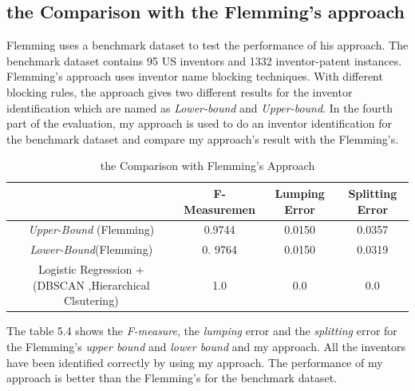 \subsection{the Comparison with the Flemming's approach}
Flemming uses a benchmark dataset to test the performance of his approach. The benchmark dataset contains 95 US inventors and 1332 inventor-patent instances.  Flemming's approach uses inventor name blocking techniques.  With different blocking rules, the approach gives two different results for the inventor identification which are named as \emph{Lower-bound} and \emph{Upper-bound}. In the fourth part of the evaluation, my approach is used to do an inventor identification for the benchmark dataset and compare my approach's result with the Flemming's. \newline
\begin{table}
\scriptsize
\begin{tabular}{|c|c|c|c|}
\hline
&F-Measuremen&Lumping Error&Splitting Error\\
\hline

\emph{Upper-Bound} (Flemming)&0.9744 &0.0150&0.0357\\

\hline

\emph{Lower-Bound}(Flemming)&0. 9764& 0.0150& 0.0319\\
\hline
Logistic Regression + (DBSCAN ,Hierarchical Clsutering) & 1.0 &0.0&0.0\\
\hline
\end{tabular}
\caption{the Comparison with Flemming's Approach}
\end{table}

The table 5.4 shows the \emph{F-measure}, the \emph{lumping} error and the \emph{splitting} error for the Flemming's \emph{upper bound} and \emph{lower bound} and my approach. All the inventors have been identified correctly by using my approach. The performance of my approach is better than the Flemming's for the benchmark dataset. 


